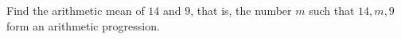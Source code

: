 Find the arithmetic mean of $14$ and $9$, that is, the number $m$ such that $14,m,9$ form an arithmetic progression.
